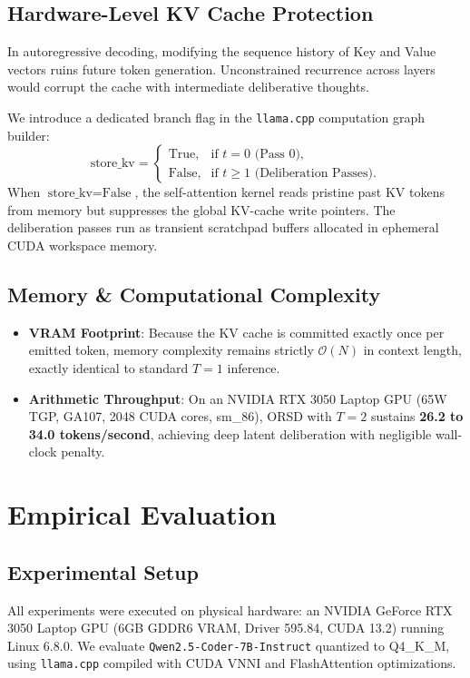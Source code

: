 \documentclass[11pt,a4paper]{article}
\theoremstyle{plain}
\theoremstyle{definition}
\theoremstyle{remark}
\begin{document}
\subsection{Hardware-Level KV Cache Protection}
In autoregressive decoding, modifying the sequence history of Key and Value vectors ruins future token generation. Unconstrained recurrence across layers would corrupt the cache with intermediate deliberative thoughts.

We introduce a dedicated branch flag in the \texttt{llama.cpp} computation graph builder:
\begin{equation}
    \text{store\_kv} = 
    \begin{cases} 
    \text{True}, & \text{if } t = 0 \text{ (Pass 0)}, \\
    \text{False}, & \text{if } t \ge 1 \text{ (Deliberation Passes)}.
    \end{cases}
\end{equation}
When $\text{store\_kv} = \text{False}$, the self-attention kernel reads pristine past KV tokens from memory but suppresses the global KV-cache write pointers. The deliberation passes run as transient scratchpad buffers allocated in ephemeral CUDA workspace memory.

\subsection{Memory \& Computational Complexity}
\begin{itemize}
    \item \textbf{VRAM Footprint}: Because the KV cache is committed exactly once per emitted token, memory complexity remains strictly $\mathcal{O}(N)$ in context length, exactly identical to standard $T=1$ inference.
    \item \textbf{Arithmetic Throughput}: On an NVIDIA RTX 3050 Laptop GPU (65W TGP, GA107, 2048 CUDA cores, sm\_86), ORSD with $T=2$ sustains \textbf{26.2 to 34.0 tokens/second}, achieving deep latent deliberation with negligible wall-clock penalty.
\end{itemize}

\section{Empirical Evaluation}

\subsection{Experimental Setup}
All experiments were executed on physical hardware: an NVIDIA GeForce RTX 3050 Laptop GPU (6GB GDDR6 VRAM, Driver 595.84, CUDA 13.2) running Linux 6.8.0. We evaluate \texttt{Qwen2.5-Coder-7B-Instruct} quantized to Q4\_K\_M, using \texttt{llama.cpp} compiled with CUDA VNNI and FlashAttention optimizations.
\end{document}
